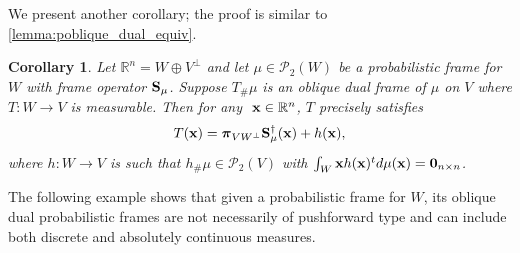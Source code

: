 \documentclass{amsart}
\numberwithin{equation}{section}
\newcommand{\bpi}{{\boldsymbol{\pi}}}
\theoremstyle{plain}
\newtheorem{corollary}[theorem]{Corollary}
\theoremstyle{remark}
\theoremstyle{definition}
\begin{document}
We present another corollary; the proof is similar to \cref{lemma:poblique_dual_equiv}. 
\begin{corollary}
 Let $\mathbb{R}^n = W \oplus V^\perp$ and let $\mu \in \mathcal{P}_2(W)$ be a probabilistic frame for $W$ with frame operator ${\bf S}_\mu$. 
  Suppose $T_\# \mu$ is an oblique dual frame of $\mu$ on $V$ where $T: W \rightarrow V$ is measurable.
 Then for any $\ {\bf x} \in \mathbb{R}^n$, $T$ precisely satisfies 
   \begin{equation*}
        T({\bf x}) = \bpi_{VW^\perp}{\bf S}_\mu^{\dagger}({\bf x}) + h({\bf x}),
      \end{equation*}
where $h: W \rightarrow V$ is such that $h_\#\mu \in \mathcal{P}_2(V)$ with $ \int_{W } {\bf x} h({\bf x})^t d\mu({\bf x}) = {\bf 0}_{n \times n}$.
\end{corollary}

The following example shows that given a probabilistic frame for $W$, its oblique dual probabilistic frames are not necessarily of pushforward type and can include both discrete and absolutely continuous measures.
\end{document}
